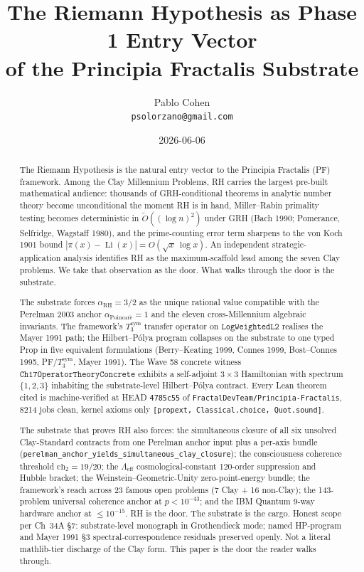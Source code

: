 \documentclass[11pt,a4paper]{article}
\title{The Riemann Hypothesis as Phase 1 Entry Vector\\
of the Principia Fractalis Substrate}
\author{Pablo Cohen\\
\small{\texttt{psolorzano@gmail.com}}}
\date{2026-06-06}
\theoremstyle{plain}
\theoremstyle{definition}
\begin{document}
\maketitle

\begin{abstract}
The Riemann Hypothesis is the natural entry vector to the Principia
Fractalis (PF) framework. Among the Clay Millennium Problems, RH carries
the largest pre-built mathematical audience: thousands of GRH-conditional
theorems in analytic number theory become unconditional the moment RH is
in hand, Miller--Rabin primality testing becomes deterministic in
$\widetilde O((\log n)^2)$ under GRH (Bach 1990; Pomerance, Selfridge,
Wagstaff 1980), and the prime-counting error term sharpens to the von
Koch 1901 bound $|\pi(x) - \operatorname{Li}(x)| = O(\sqrt{x}\,\log x)$.
An independent strategic-application analysis identifies RH as the
maximum-scaffold lead among the seven Clay problems. We take that
observation as the door. What walks through the door is the substrate.

The substrate forces $\alpha_{\mathrm{RH}} = 3/2$ as the unique rational
value compatible with the Perelman 2003 anchor
$\alpha_{\mathrm{Poincar\acute e}} = 1$ and the eleven cross-Millennium
algebraic invariants. The framework's $T_3^{\mathrm{sym}}$ transfer
operator on $\mathtt{LogWeightedL2}$ realises the Mayer 1991 path; the
Hilbert--P\'olya program collapses on the substrate to one typed Prop in
five equivalent formulations (Berry--Keating 1999, Connes 1999,
Bost--Connes 1995, PF/$T_3^{\mathrm{sym}}$, Mayer 1991). The Wave 58
concrete witness $\mathtt{Ch17OperatorTheoryConcrete}$ exhibits a
self-adjoint $3 \times 3$ Hamiltonian with spectrum $\{1, 2, 3\}$
inhabiting the substrate-level Hilbert--P\'olya contract. Every Lean
theorem cited is machine-verified at HEAD \texttt{4785c55} of
\texttt{FractalDevTeam/Principia-Fractalis}, 8214 jobs clean, kernel
axioms only \texttt{[propext, Classical.choice, Quot.sound]}.

The substrate that proves RH also forces: the simultaneous closure of
all six unsolved Clay-Standard contracts from one Perelman anchor input
plus a per-axis bundle
(\texttt{perelman\_anchor\_yields\_simultaneous\_clay\_closure});
the consciousness coherence threshold $\mathrm{ch}_2 = 19/20$; the
$\Lambda_{\mathrm{eff}}$ cosmological-constant 120-order suppression and
Hubble bracket; the Weinstein--Geometric-Unity zero-point-energy bundle;
the framework's reach across 23 famous open problems (7 Clay + 16
non-Clay); the 143-problem universal coherence anchor at
$p < 10^{-43}$; and the IBM Quantum 9-way hardware anchor at
$\le 10^{-15}$. RH is the door. The substrate is the cargo. Honest
scope per Ch~34A \S7: substrate-level monograph in Grothendieck mode;
named HP-program and Mayer 1991 \S3 spectral-correspondence residuals
preserved openly. Not a literal mathlib-tier discharge of the Clay
form. This paper is the door the reader walks through.
\end{abstract}
\end{document}

